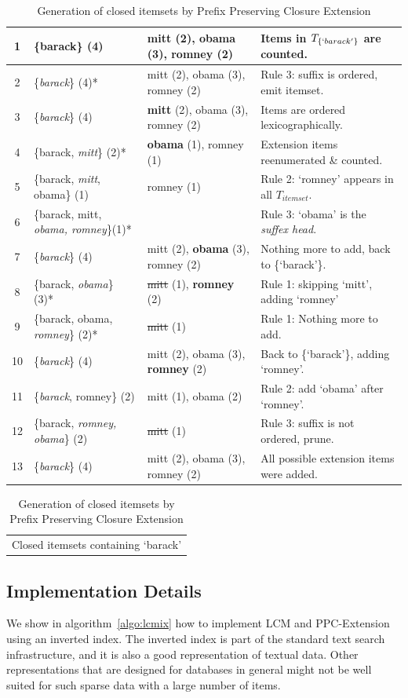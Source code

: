 \documentclass{sig-alternate}
\begin{document}
\begin{table}
\begin{tabular}{|c|p{5cm}|p{5cm}|p{5.5cm}|}
1& \{barack\} (4) & mitt (2), obama (3), romney (2) & {\small Items in $T_{\{`barack'\}}$ are counted. }\\\hline 
2& \{\emph{barack}\} (4)* & mitt (2), obama (3), romney (2) &  {\small Rule 3: suffix is ordered, emit itemset.  } \\ \hline
3& \{\emph{barack}\} (4) & \textbf{mitt} (2), obama (3), romney (2) &  {\small Items are ordered lexicographically.} \\ \hline
4& \{barack, \emph{mitt}\} (2)* & \textbf{obama} (1), romney (1) &  {\small Extension items reenumerated \& counted.}\\\hline
5 & \{barack, \emph{mitt}, obama\} (1) & romney (1)                       &  {\small Rule 2: `romney' appears in all $T_{itemset}$. } \\\hline
6 & \{barack, mitt, \emph{obama, romney}\}(1)* & & {\small Rule 3: `obama'  is the \emph{suffex head}. } \\\hline
7 & \{\emph{barack}\} (4) & mitt (2), \textbf{obama} (3), romney (2) &  {\small Nothing more to add, back to \{`barack'\}.}\\\hline
8 & \{barack, \emph{obama}\} (3)* & \sout{mitt} (1), \textbf{romney} (2) &  {\small Rule 1: skipping `mitt', adding `romney'  } \\\hline
9 & \{barack, obama, \emph{romney}\} (2)* & \sout{mitt} (1) &  {\small Rule 1: Nothing more to add.  } \\\hline
10 & \{\emph{barack}\} (4) & mitt (2), obama (3), \textbf{romney} (2) &  {\small Back to \{`barack'\}, adding `romney'. } \\\hline
11 & \{\emph{barack}, romney\} (2) &  mitt (1), obama (2) &  {\small Rule 2: add `obama' after `romney'. } \\\hline
12 & \{barack, \emph{romney, obama}\} (2) &  \sout{mitt} (1)  &  {\small Rule 3: suffix is not ordered, prune.} \\\hline
13 & \{\emph{barack}\} (4) & mitt (2), obama (3), romney (2) &  {\small All possible extension items were added. } \\\hline
\end{tabular}
\begin{tabular}{c}
Closed itemsets containing `barack'
\end{tabular}

\caption{Generation of closed itemsets by Prefix Preserving Closure Extension}
\label{table:PPCExample}
\end{table}


\subsection{Implementation Details}
We show in algorithm~\ref{algo:lcmix} how to implement LCM and PPC-Extension
using an inverted index.
The inverted index is part of the standard text search infrastructure,
and it is also a  good representation of textual data. 
Other representations that are designed for databases in general
might not be well suited for such sparse data with a large number of items. 
\end{document}
